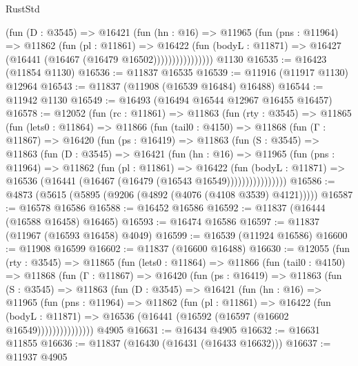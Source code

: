 \begin{lexlean}{RustStd}
\begin{coremodule}
{\begin{coremodule}
{{{{{{{{{{{{{{{{{{{{{{{{{{{{{{{{{{{{{{{{{{{{{{{{{{                    (fun (D : @3545) =>
                    @16421
                      (fun (hn : @16) =>
                      @11965
                        (fun (pns : @11964) =>
                        @11862
                          (fun (pl : @11861) =>
                          @16422
                            (fun (bodyL : @11871) =>
                            @16427 (@16441 (@16467 (@16479 @16502))))))))))))))))
    @1130
@16535 := @16423 (@11854 @1130)
@16536 := @11837 @16535
@16539 := @11916 (@11917 @1130) @12964
@16543 := @11837 (@11908 (@16539 @16484) @16488)
@16544 := @11942 @1130
@16549 := @16493 (@16494 @16544 @12967 @16455 @16457)
@16578 := @12052
    (fun (rc : @11861) =>
    @11863
      (fun (rty : @3545) =>
      @11865
        (fun (lets0 : @11864) =>
        @11866
          (fun (tail0 : @4150) =>
          @11868
            (fun (Γ : @11867) =>
            @16420
              (fun (ps : @16419) =>
              @11863
                (fun (S : @3545) =>
                @11863
                  (fun (D : @3545) =>
                  @16421
                    (fun (hn : @16) =>
                    @11965
                      (fun (pns : @11964) =>
                      @11862
                        (fun (pl : @11861) =>
                        @16422
                          (fun (bodyL : @11871) =>
                          @16536 (@16441 (@16467 (@16479 (@16543 @16549))))))))))))))))
@16586 := @4873 (@5615 (@5895 (@9206 (@4892 (@4076 (@4108 @3539) @4121)))))
@16587 := @16578 @16586
@16588 := @16452 @16586
@16592 := @11837 (@16444 (@16588 @16458) @16465)
@16593 := @16474 @16586
@16597 := @11837 (@11967 (@16593 @16458) @4049)
@16599 := @16539 (@11924 @16586)
@16600 := @11908 @16599
@16602 := @11837 (@16600 @16488)
@16630 := @12055
    (fun (rty : @3545) =>
    @11865
      (fun (lets0 : @11864) =>
      @11866
        (fun (tail0 : @4150) =>
        @11868
          (fun (Γ : @11867) =>
          @16420
            (fun (ps : @16419) =>
            @11863
              (fun (S : @3545) =>
              @11863
                (fun (D : @3545) =>
                @16421
                  (fun (hn : @16) =>
                  @11965
                    (fun (pns : @11964) =>
                    @11862
                      (fun (pl : @11861) =>
                      @16422
                        (fun (bodyL : @11871) =>
                        @16536 (@16441 (@16592 (@16597 (@16602 @16549)))))))))))))))
    @4905
@16631 := @16434 @4905
@16632 := @16631 @11855
@16636 := @11837 (@16430 (@16431 (@16433 @16632)))
@16637 := @11937 @4905
}}}}}}}}}}}}}}}}}}}}}}}}}}}}}}}}}}}}}}}}}}}}}}}}}}
\end{coremodule}}
\end{coremodule}
\end{lexlean}
